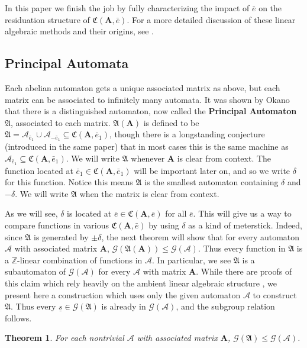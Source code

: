 \documentclass[final]{ws-ijac}
\newcommand{\A}{\mathcal{A}}
\newcommand{\G}{\mathcal{G}}
\renewcommand{\P}{\mathfrak{A}}
\newcommand{\C}{\mathfrak{C}(\Am,\e)}
\newcommand{\Z}{\mathbb{Z}}
\newcommand{\2}{\textbf{2}}
\newcommand{\Am}{\textbf{A}}
\newcommand{\e}{\bar{e}}
\newtheorem{thm}{Theorem}
\begin{document}
In this paper we finish the job by fully
characterizing the impact of $\e$ on the residuation structure of $\C$.
For a more detailed discussion of these linear algebraic methods and their 
origins, see %
\cite{Nekrashevych05:self_similar_groups,NekrashevychSidki04:automorphisms}.

\subsection{Principal Automata}
Each abelian automaton gets a unique associated matrix as above, but each
matrix can be associated to infinitely many automata.
It was shown by Okano \cite{Okano15:thesis} that there is a 
distinguished automaton, now called the \textbf{Principal Automaton} $\P$, 
associated to each matrix. $\P(\Am)$ is defined to be 
$\P = \A_{\e_1} \cup \A_{-\e_1} \subseteq \mathfrak{C}(\Am, \e_1)$,
though there is a longstanding conjecture (introduced in the same paper) 
that in most cases this is the same machine as 
$\A_{\e_1} \subseteq \mathfrak{C}(\Am, \e_1)$. We will write $\P$ whenever $\Am$
is clear from context. The function located at $\e_1 \in \mathfrak{C}(\Am, \e_1)$ 
will be important later on, and so we write $\delta$ for this function. Notice this 
means $\P$ is the smallest automaton containing $\delta$ and $-\delta$.
We will write $\P$ when the matrix is clear from context. 

As we will see, $\delta$ is located at $\e \in \C$ for all $\e$. This will 
give us a way to compare functions in various $\C$ by using $\delta$ as a 
kind of meterstick. Indeed, since $\P$ is generated by $\pm \delta$, the
next theorem will show that for every automaton $\A$ with associated matrix $\Am$, 
$\G(\P(\Am)) \leq \G(\A)$. Thus every function in $\P$ is a $\Z$-linear 
combination of functions in $\A$. In particular, we see
$\P$ is a subautomaton of $\G(\A)$ for every $\A$ with matrix $\Am$.
While there are proofs of this claim which rely heavily on the
ambient linear algebraic structure \cite{Okano15:thesis}, 
we present here a construction which uses only the given 
automaton $\A$ to construct $\P$. Thus every $\underline{s} \in \G(\P)$ 
is already in $\G(\A)$, and the subgroup relation follows.

\begin{thm}
  For each nontrivial $\A$ with associated matrix $\Am$, $\G(\P) \leq \G(\A)$.
\end{thm}
\end{document}
